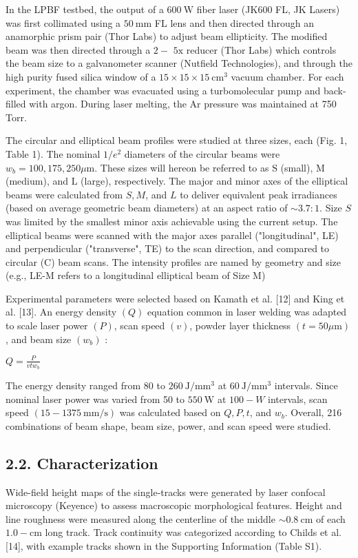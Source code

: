 \documentclass[10pt]{article}
\begin{document}
In the LPBF testbed, the output of a $600 \mathrm{~W}$ fiber laser (JK600 FL, JK Lasers) was first collimated using a $50 \mathrm{~mm}$ FL lens and then directed through an anamorphic prism pair (Thor Labs) to adjust beam ellipticity. The modified beam was then directed through a $2-$ $5 \mathrm{x}$ reducer (Thor Labs) which controls the beam size to a galvanometer scanner (Nutfield Technologies), and through the high purity fused silica window of a $15 \times 15 \times 15 \mathrm{~cm}^{3}$ vacuum chamber. For each experiment, the chamber was evacuated using a turbomolecular pump and back-filled with argon. During laser melting, the Ar pressure was maintained at 750 Torr.

The circular and elliptical beam profiles were studied at three sizes, each (Fig. 1, Table 1). The nominal $1 / e^{2}$ diameters of the circular beams were $w_{b}=100,175,250 \mu \mathrm{m}$. These sizes will hereon be referred to as $\mathrm{S}$ (small), $\mathrm{M}$ (medium), and $\mathrm{L}$ (large), respectively. The major and minor axes of the elliptical beams were calculated from $S, M$, and $L$ to deliver equivalent peak irradiances (based on average geometric beam diameters) at an aspect ratio of $\sim 3.7: 1$. Size $S$ was limited by the smallest minor axis achievable using the current setup. The elliptical beams were scanned with the major axes parallel ("longitudinal", LE) and perpendicular ("transverse", TE) to the scan direction, and compared to circular (C) beam scans. The intensity profiles are named by geometry and size (e.g., LE-M refers to a longitudinal elliptical beam of Size M)

Experimental parameters were selected based on Kamath et al. [12] and King et al. [13]. An energy density $(Q)$ equation common in laser welding was adapted to scale laser power $(P)$, scan speed $(v)$, powder layer thickness $(t=50 \mu \mathrm{m})$, and beam size $\left(w_{b}\right)$ :

$Q=\frac{P}{v t w_{b}}$

The energy density ranged from 80 to $260 \mathrm{~J} / \mathrm{mm}^{3}$ at $60 \mathrm{~J} / \mathrm{mm}^{3}$ intervals. Since nominal laser power was varied from 50 to $550 \mathrm{~W}$ at $100-W$ intervals, scan speed $(15-1375 \mathrm{~mm} / \mathrm{s})$ was calculated based on $Q, P, t$, and $w_{b}$. Overall, 216 combinations of beam shape, beam size, power, and scan speed were studied.

\subsection*{2.2. Characterization}
Wide-field height maps of the single-tracks were generated by laser confocal microscopy (Keyence) to assess macroscopic morphological features. Height and line roughness were measured along the centerline of the middle $\sim 0.8 \mathrm{~cm}$ of each $1.0-\mathrm{cm}$ long track. Track continuity was categorized according to Childs et al. [14], with example tracks shown in the Supporting Information (Table S1).
\end{document}
